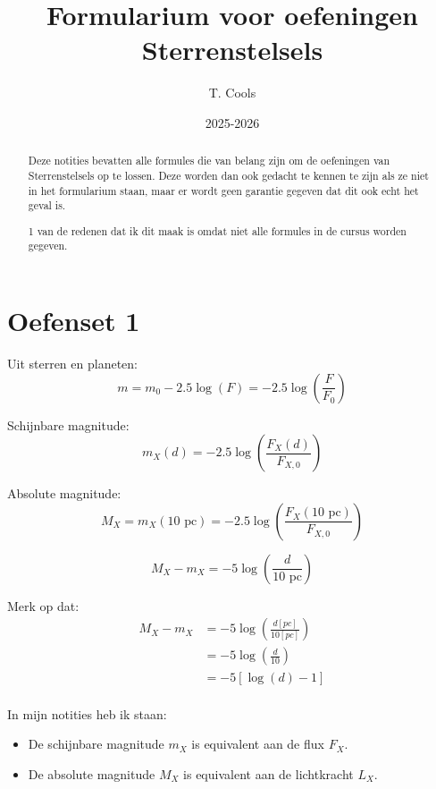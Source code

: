 \documentclass[a4paper,twoside]{article}
\title{Formularium voor oefeningen Sterrenstelsels}
\author{T. Cools}
\date{ 2025-2026}
\theoremstyle{definition}
\theoremstyle{plain}
\begin{document}
\maketitle

\begin{abstract}

Deze notities bevatten alle formules die van belang zijn om de oefeningen van Sterrenstelsels op te lossen.
Deze worden dan ook gedacht te kennen te zijn als ze niet in het formularium staan, maar er wordt geen garantie gegeven dat dit ook echt het geval is.

1 van de redenen dat ik dit maak is omdat niet alle formules in de cursus worden gegeven.
\end{abstract}

\section{Oefenset 1}

Uit sterren en planeten:
\[
m = m_0 -2.5\log\left(F\right) = -2.5\log\left(\frac{F}{F_{0}}\right)
\]

Schijnbare magnitude:
\begin{equation}
    m_X (d) = -2.5 \log \left( \frac{F_X (d)}{F_{X,0}} \right)
\end{equation}

Absolute magnitude:
\begin{equation}
    M_X = m_X(10 \text{ pc}) = -2.5 \log \left( \frac{F_X (10 \text{ pc})}{F_{X,0}} \right)
\end{equation}

\begin{equation}
    M_X - m_X = - 5 \log \left( \frac{d}{10 \text{ pc}} \right)
\end{equation}

Merk op dat:
\begin{align*}
    M_X - m_X &= - 5 \log \left( \frac{d [pc]}{10 [pc]} \right) \\
    &= - 5 \log \left( \frac{d}{10} \right) \\
    &= - 5 \left[\log \left( d \right) - 1\right]  \\
\end{align*}

In mijn notities heb ik staan:
\begin{itemize}
    \item De schijnbare magnitude \(m_X\) is equivalent aan de flux \(F_X\).
    \item De absolute magnitude \(M_X\) is equivalent aan de lichtkracht \(L_X\).
\end{itemize}
\end{document}
